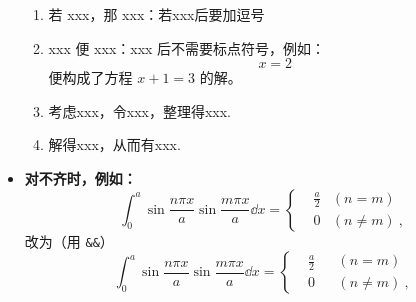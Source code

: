 \begin{itemize}
\begin{enumerate}
\item 若 xxx，那 xxx：若xxx后要加逗号
\item xxx 便 xxx：xxx 后不需要标点符号，例如：
\begin{equation}
x=2~
\end{equation}
便构成了方程 $x+1=3$ 的解。
\item 考虑xxx，令xxx，整理得xxx.
\item 解得xxx，从而有xxx.
\end{enumerate}




\item \textbf{对不齐时，例如：}
\begin{equation}
\int_0^a\sin\frac{n\pi x}{a}\sin\frac{m\pi x}{a}\dd x=\left\{\begin{aligned}
&\frac{a}{2}&(n=m)\\
& 0     &(n\neq m)~,
\end{aligned}\right.
\end{equation}
改为（用 \verb|&&|）
\begin{equation}
\int_0^a\sin\frac{n\pi x}{a}\sin\frac{m\pi x}{a}\dd x=\left\{\begin{aligned}
&\frac{a}{2}&&(n=m)\\
& 0     &&(n\neq m)~,
\end{aligned}\right.
\end{equation}
\end{itemize}
